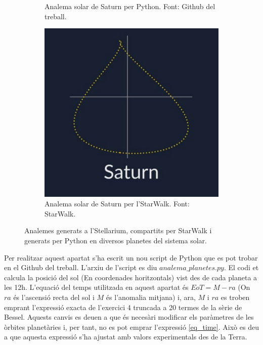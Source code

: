 \documentclass[a4paper, 11pt]{article}
\begin{document}
\begin{figure}[h!]
\begin{subfigure}{0.45\textwidth}
        \caption{Analema solar de Saturn per Python. Font: Github del treball.}
    \end{subfigure}
    \hspace{0.05\textwidth}
    \begin{subfigure}{0.42\textwidth}
        \centering
        \includegraphics[width=\textwidth]{images/stellarium_saturn_general.png}
        \caption{Analema solar de Saturn per l'StarWalk. Font: StarWalk.}
    \end{subfigure}
\caption{Analemes generats a l'Stellarium, compartits per StarWalk i generats per Python en diversos planetes del sistema solar.}
\label{fig:planetes}
\end{figure}
\vspace{2mm}

\noindent Per realitzar aquest apartat s'ha escrit un nou script de Python que es pot trobar en el Github del treball. L'arxiu de l'script es diu $analema\_planetes.py$. El codi et calcula la posició del sol (En coordenades horitzontals) vist des de cada planeta a les 12h. L'equació del temps utilitzada en aquest apartat és $EoT = M - ra$ (On $ra$ és l'ascensió recta del sol i $M$ és l'anomalia mitjana) i, ara, $M$ i $ra$ es troben emprant l'expressió exacta de l'exercici 4 truncada a 20 termes de la sèrie de Bessel. Aquests canvis es deuen a que és necesàri modificar els paràmetres de les òrbites planetàries i, per tant, no es pot emprar l'expressió \ref{eq_time}. Això es deu a que aquesta expressió s'ha ajustat amb valors experimentals des de la Terra.
\end{document}
